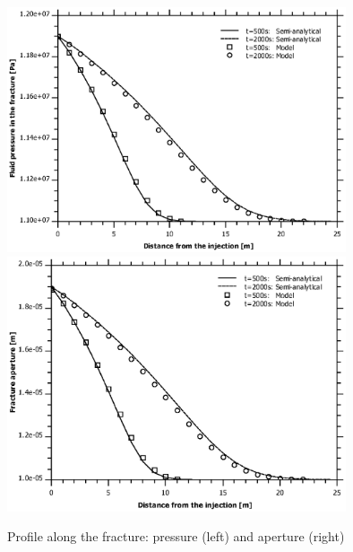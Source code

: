 \begin{figure}
\centering
\includegraphics[width=100mm]{PART_III/HM/figures/hm_Wijesinghe_p}
\includegraphics[width=100mm]{PART_III/HM/figures/hm_Wijesinghe_b}
\caption{Profile along the fracture: pressure (left) and aperture (right)}
\label{fig:ex_hm_single_result}
\end{figure}